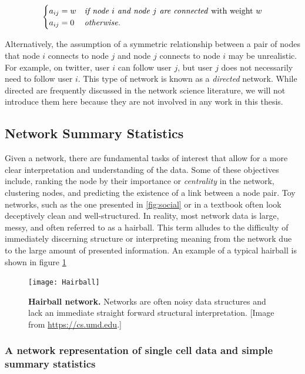\[ \begin{cases} 
     a_{ij}=w & \text{\emph{if node $i$ and node $j$ are connected} with weight $w$} \\
      a_{ij}=0 & \text{\emph{otherwise}}.
         \end{cases}
\]

Alternatively, the assumption of a symmetric relationship between a pair of nodes that node $i$ connects to node $j$ and node $j$ connects to node $i$  may be unrealistic. For example, on twitter, user $i$ can follow user $j$, but user $j$ does not necessarily need to follow user $i$. This type of network is known as a \emph{directed} network. While directed are frequently discussed in the network science literature, we will not introduce them here because they are not involved in any work in this thesis. 

\subsection{Network Summary Statistics}

\indent Given a network, there are fundamental tasks of interest that allow for a more clear interpretation and understanding of the data. Some of these objectives include, ranking the node by their importance or \emph{centrality} in the network, clustering nodes, and predicting the existence of a link between a node pair. Toy networks, such as the one presented in \ref{fig:social} or in a textbook often look deceptively clean and well-structured. In reality, most network data is large, messy, and often referred to as a hairball. This term alludes to the difficulty of immediately discerning structure or interpreting meaning from the network due to the large amount of presented information. An example of a typical hairball is shown in figure \ref{fig:Hairball}

\begin{figure}
\begin{center}
\texttt{[image: Hairball]}
\caption{{\bf Hairball network.} Networks are often noisy data structures and lack an immediate straight forward structural interpretation. [Image from \url{https://cs.umd.edu}.]}
\label{fig:Hairball}
\end{center}
\end{figure}

\subsubsection{A network representation of single cell data and simple summary statistics}

